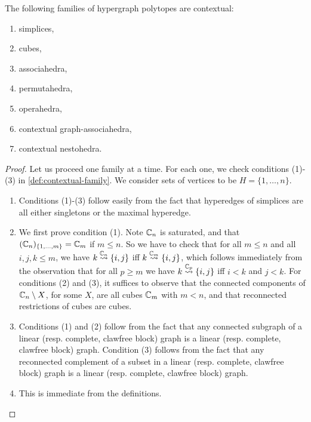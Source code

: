 \begin{samepage}
  \begin{theorem}
    \label{thm:examples}
    The following families of hypergraph polytopes are contextual:
    \begin{enumerate}[label=(\alph*)]
      \item simplices,
      \item cubes,
      \item associahedra,
      \item permutahedra,
      \item operahedra,
      \item contextual graph-associahedra,
      \item contextual nestohedra.
    \end{enumerate}
  \end{theorem}
\end{samepage}

\begin{proof}
  Let us proceed one family at a time.
  For each one, we check conditions (1)-(3) in \cref{def:contextual-family}.
  We consider sets of vertices to be $H=\{1,\ldots,n\}$.
  \begin{enumerate}[label=(\alph*)]
    \item Conditions (1)-(3) follow easily from the fact that hyperedges of simplices are all either singletons or the maximal hyperedge.
    \item We first prove condition (1). 
    Note ${\mathbb C}_n$ is saturated, and that $({\mathbb C}_n)_{\left\{1,\ldots,m\right\}}={\mathbb C}_m$ if $m\leq n$.
    So we have to check that for all $m\leq n$ and all $i,j,k\leq m$, we have $k\stackrel{{{\mathbb C}_n}}{\rightsquigarrow}\left\{i,j\right\}$ iff
    $k\stackrel{{{\mathbb C}_m}}{\rightsquigarrow}\left\{i,j\right\}$, which follows immediately from the observation that for all $p\geq m$ we have
    $k\stackrel{{{\mathbb C}_p}}{\rightsquigarrow}\left\{i,j\right\}$ iff $i<k$ and $j<k$.
    For conditions (2) and (3), it suffices to observe that the connected components of ${\mathbb C}_n\setminus X$, for some $X$, are all cubes ${\mathbb C}_m$ with $m<n$, and that reconnected restrictions of cubes are cubes.
    \item[(c)-(e)] Conditions (1) and (2) follow from the fact that any connected subgraph of a linear (resp. complete, clawfree block) graph is a linear (resp. complete, clawfree block) graph. 
    Condition (3) follows from the fact that any reconnected complement of a subset in a linear (resp. complete, clawfree block) graph is a linear (resp. complete, clawfree block) graph.
    \item[(f)-(g)] This is immediate from the definitions.
  \end{enumerate}
\end{proof}

